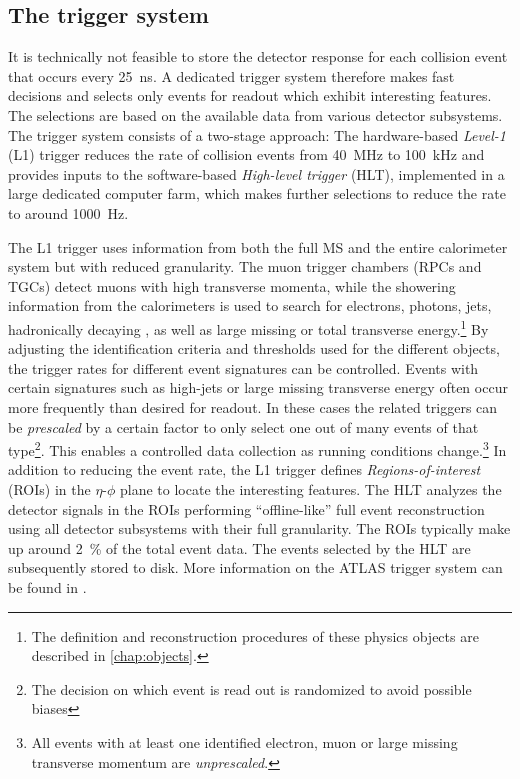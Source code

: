 \subsection{The trigger system}
\label{sec:trigger-system}
It is technically not feasible to store the detector response for each collision event that occurs every \SI{25}{\nano\second}.
A dedicated trigger system therefore makes fast decisions and selects only events for readout which exhibit interesting features.
The selections are based on the available data from various detector subsystems.
The \RunTwo trigger system consists of a two-stage approach:
The hardware-based \emph{Level-1} (L1) trigger reduces the rate of collision events from \SI{40}{\mega\hertz} to \SI{100}{\kilo\hertz} and provides inputs to the software-based \emph{High-level trigger} (HLT), implemented in a large dedicated computer farm, which makes further selections to reduce the rate to around \SI{1000}{\hertz}.

The L1 trigger uses information from both the full MS and the entire calorimeter system but with reduced granularity.
The muon trigger chambers (RPCs and TGCs) detect muons with high transverse momenta, while the showering information from the calorimeters is used to search for electrons, photons, jets, hadronically decaying \tauleptons, as well as large missing or total transverse energy.\footnote{The definition and reconstruction procedures of these physics objects are described in \cref{chap:objects}.}
By adjusting the identification criteria and thresholds used for the different objects, the trigger rates for different event signatures can be controlled.
Events with certain signatures such as high-\pT jets or large missing transverse energy often occur more frequently than desired for readout. In these cases the related triggers can be \emph{prescaled} by a certain factor to only select one out of many events of that type\footnote{The decision on which event is read out is randomized to avoid possible biases}. This enables a controlled data collection as running conditions change.\footnote{All events with at least one identified electron, muon or large missing transverse momentum are \emph{unprescaled}.}
In addition to reducing the event rate, the L1 trigger defines \emph{Regions-of-interest} (ROIs) in the $\eta$-$\phi$ plane to locate the interesting features.
The HLT analyzes the detector signals in the ROIs performing ``offline-like'' full event reconstruction using all detector subsystems with their full granularity. The ROIs typically make up around \SI{2}{\percent} of the total event data.
The events selected by the HLT are subsequently stored to disk.
More information on the ATLAS trigger system can be found in .

